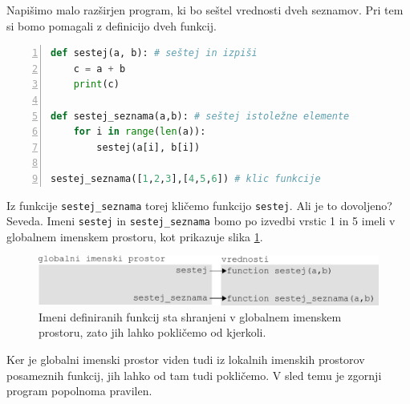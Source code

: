 Napišimo malo razširjen program, ki bo seštel vrednosti dveh seznamov. Pri tem si bomo pomagali z definicijo dveh funkcij.
\begin{lstlisting}[language=Python,numbers=left]
def sestej(a, b): # seštej in izpiši
    c = a + b
    print(c)

def sestej_seznama(a,b): # seštej istoležne elemente
    for i in range(len(a)):
        sestej(a[i], b[i])

sestej_seznama([1,2,3],[4,5,6]) # klic funkcije
\end{lstlisting}
Iz funkcije \texttt{sestej\_seznama} torej kličemo funkcijo \texttt{sestej}. Ali je to dovoljeno? Seveda. Imeni \texttt{sestej} in \texttt{sestej\_seznama} bomo po izvedbi vrstic 1 in 5 imeli v globalnem imenskem prostoru, kot prikazuje slika  \ref{img:imenski_prostor_7}.
\begin{figure}
    \centering
    \includegraphics[width=\linewidth]{img/imenski_prostor_7.pdf}
    \caption{Imeni definiranih funkcij sta shranjeni v globalnem imenskem prostoru, zato jih lahko pokličemo od kjerkoli.}
    \label{img:imenski_prostor_7}
\end{figure}

Ker je globalni imenski prostor viden tudi iz lokalnih imenskih prostorov posameznih funkcij, jih lahko od tam tudi pokličemo. V sled temu je zgornji program popolnoma pravilen. 

